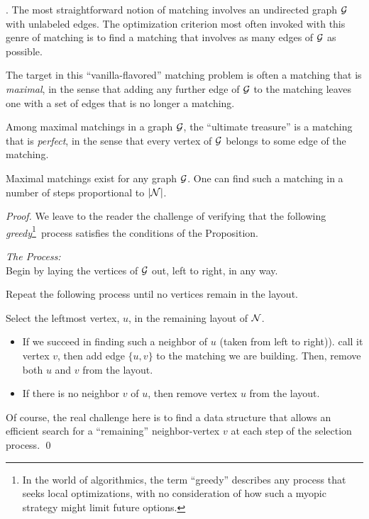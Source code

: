 .
The most straightforward notion of matching involves an undirected graph $\mbox{$\cal G$}$ with unlabeled edges.  The optimization criterion most often invoked with this genre of matching is to find a matching that involves as many edges of $\mbox{$\cal G$}$ as possible.

\smallskip


The target in this ``vanilla-flavored'' matching problem is often a matching that is {\em maximal},  in the sense that adding any further edge of $\mbox{$\cal G$}$ to the matching leaves one with a set of edges that is no longer a matching.

\smallskip


Among maximal matchings in a graph $\mbox{$\cal G$}$, the ``ultimate treasure'' is a matching that is {\it perfect}, in the sense that every vertex of $\mbox{$\cal G$}$ belongs to some edge of the matching.

\begin{prop}
\label{thm:max-matching}
Maximal matchings exist for any graph $\mbox{$\cal G$}$.  One can find such a matching in a number of steps proportional to $|\mbox{$\cal N$}|$.
\end{prop}


\begin{proof}
We leave to the reader the challenge of verifying that the following {\em greedy}\footnote{\label{foot:greedy}In the world of algorithmics, the term ``greedy'' describes any process that seeks local optimizations, with no consideration of how such a myopic strategy might limit future options.}~process satisfies the conditions of the Proposition.

\medskip

\noindent
{\it The Process:} \\
Begin by laying the vertices of $\mbox{$\cal G$}$ out, left to right, in any way.

\smallskip

\noindent
Repeat the following process until no vertices remain in the layout.

\smallskip

\noindent
Select the leftmost vertex, $u$, in the remaining layout of $\mbox{$\cal N$}$.
  \begin{itemize}
  \item
If we succeed in finding such a neighbor of $u$ (taken from left to right)). call it vertex $v$, then add edge $\{u,v\}$ to the matching we are building.  Then, remove both $u$ and $v$ from the layout.
  \medskip\item
If there is no neighbor $v$ of $u$, then remove vertex $u$ from the layout.
  \end{itemize}
Of course, the real challenge here is to find a data structure that allows an efficient search for a ``remaining'' neighbor-vertex $v$ at each step of the selection process.  \qed
\end{proof}

